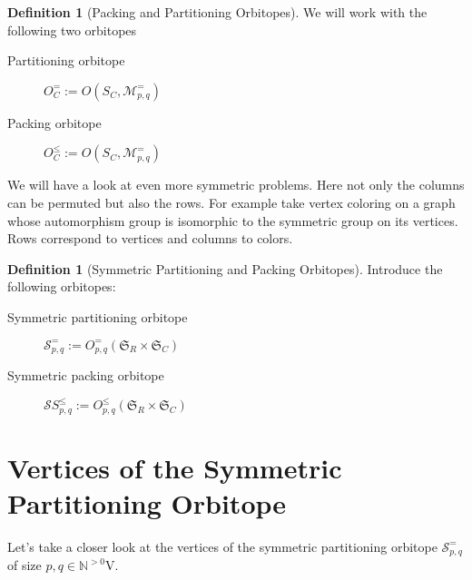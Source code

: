 \documentclass[a4paper]{amsart}
\theoremstyle{lemma}
\theoremstyle{definition}
\newtheorem{defn}[theorem]{Definition}
\theoremstyle{remark}
\newcommand\mpar[1]{\marginpar {\flushleft\sffamily\small #1}}
\newcommand{\todo}[1]{\mpar{#1}}
\newcommand{\lr}[1]{\ensuremath{\left( #1 \right)}}
\newcommand{\naturals}{\ensuremath{\mathbb{N}}}
\newcommand{\M}{\ensuremath{\mathcal{M}}}
\newcommand{\calS}{\ensuremath{\mathcal{S}}}
\newcommand{\Sym}{\ensuremath{\mathfrak{S}}}
\newcommand{\SymRC}{\ensuremath{\Sym_R \times \Sym_C}}
\begin{document}


\begin{defn}[Packing and Partitioning Orbitopes]
  We will work with the following two orbitopes
  \begin{description}
    \item[Partitioning orbitope] \(O^=_C := O \lr{S_C, \M_{p,q}^=}\)
    \item[Packing orbitope] \(O^{\leq}_C := O \lr{S_C, \M_{p,q}^=}\)
   \end{description}
\end{defn}

We will have a look at even more symmetric problems.  Here not only
the columns can be permuted but also the rows.  For example take
vertex coloring on a graph whose automorphism group is isomorphic to
the symmetric group on its vertices.  Rows correspond to vertices and
columns to colors.

\begin{defn}[Symmetric Partitioning and Packing Orbitopes]
Introduce the following orbitopes:
\begin{description}
\item[Symmetric partitioning orbitope] \(\calS^=_{p,q} := O^=_{p, q} \lr{\SymRC} \)
\item[Symmetric packing orbitope] \(\calS{S}^\leq_{p,q} := O^\leq_{p, q} \lr{\SymRC} \)
\end{description}
\end{defn}




\section{Vertices of the Symmetric Partitioning Orbitope}
Let's take a closer look at the
vertices of the symmetric partitioning orbitope \(\calS^=_{p, q}\) of size
\(p, q \in \naturals^{>0}\)V.
\end{document}
